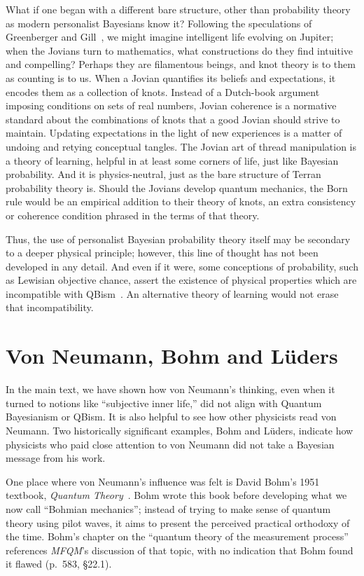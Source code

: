 \documentclass[aps,pra,superscriptaddress,12pt,tightenlines,nofootinbib]{revtex4-2}
\newcommand{\booktitle}{\textsl}
\newcommand{\MFQM}{\textsl{MFQM}}
\begin{document}
What if one began with a different bare structure, other than
probability theory as modern personalist Bayesians know it?  Following
the speculations of Greenberger and Gill~\cite[pp.\ 567,
  1265]{Fuchs2014}, we might imagine intelligent life evolving on
Jupiter; when the Jovians turn to mathematics, what constructions do
they find intuitive and compelling?  Perhaps they are filamentous
beings, and knot theory is to them as counting is to us.  When a
Jovian quantifies its beliefs and expectations, it encodes them as a
collection of knots.  Instead of a Dutch-book argument imposing
conditions on sets of real numbers, Jovian coherence is a normative
standard about the combinations of knots that a good Jovian should
strive to maintain.  Updating expectations in the light of new
experiences is a matter of undoing and retying conceptual tangles.
The Jovian art of thread manipulation is a theory of learning, helpful
in at least some corners of life, just like Bayesian probability.  And
it is physics-neutral, just as the bare structure of Terran
probability theory is.  Should the Jovians develop quantum mechanics,
the Born rule would be an empirical addition to their theory of knots,
an extra consistency or coherence condition phrased in the terms of
that theory.

Thus, the use of personalist Bayesian probability theory itself may be
secondary to a deeper physical principle; however, this line of
thought has not been developed in any detail.  And even if it were,
some conceptions of probability, such as Lewisian objective chance,
assert the existence of physical properties which are incompatible
with QBism~\cite{RMP}.  An alternative theory of learning would not
erase that incompatibility.

\section{Von Neumann, Bohm and L\"uders}

In the main text, we have shown how von Neumann's thinking, even when
it turned to notions like ``subjective inner life,'' did not align
with Quantum Bayesianism or QBism.  It is also helpful to see how
other physicists read von Neumann.  Two historically significant
examples, Bohm and L\"uders, indicate how physicists who paid close
attention to von Neumann did not take a Bayesian message from his
work.

One place where von Neumann's influence was felt is David Bohm's 1951
textbook, \booktitle{Quantum Theory}~\cite{Bohm1951}.  Bohm wrote this
book before developing what we now call ``Bohmian mechanics''; instead
of trying to make sense of quantum theory using pilot waves, it aims
to present the perceived practical orthodoxy of the time.  Bohm's
chapter on the ``quantum theory of the measurement process''
references \MFQM's discussion of that topic, with no indication that
Bohm found it flawed (p.\ 583, \S 22.1).
\end{document}

